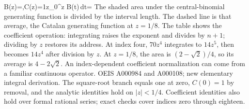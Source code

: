 {B(z)=,\qquad C(z)=\frac1z\int_0^z B(t)\,dt=}
{The shaded area under the central-binomial generating function is divided by the interval length. The dashed line is that average, the Catalan generating function at $z=1/8$. The table shows the coefficient operation: integrating raises the exponent and divides by $n+1$; dividing by $z$ restores its address.}
{At index four, $70z^4$ integrates to $14z^5$, then becomes $14z^4$ after division by $z$. At $z=1/8$, the area is $(2-\sqrt2)/4$, so its average is $4-2\sqrt2$.}
{An index-dependent coefficient normalization can come from a familiar continuous operator.}
{OEIS A000984 and A000108; new elementary integral derivation. The square-root branch equals one at zero, $C(0)=1$ by removal, and the analytic identities hold on $|z|<1/4$. Coefficient identities also hold over formal rational series; exact checks cover indices zero through eighteen.}
